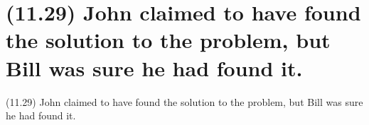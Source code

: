 \documentclass{article}
\begin{document}
\clearpage

%
%

\section*{(11.29) John claimed to have found the solution to the problem, but Bill was sure he had found it.}

\bigbreak
\begin{enumerate*}
\item[(11.29)] John claimed to have found the solution to the problem, but Bill was sure he had found it.
\end{enumerate*}
\bigbreak
\end{document}
